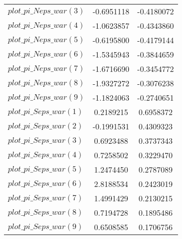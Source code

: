 \begin{center}
\begin{longtable}{lcc}
$plot\_pi\_N eps\_war (3)   $	 & 	     -0.6951118	 & 	     -0.4180072 \\ 
$plot\_pi\_N eps\_war (4)   $	 & 	     -1.0623857	 & 	     -0.4343860 \\ 
$plot\_pi\_N eps\_war (5)   $	 & 	     -0.6195800	 & 	     -0.4179144 \\ 
$plot\_pi\_N eps\_war (6)   $	 & 	     -1.5345943	 & 	     -0.3844659 \\ 
$plot\_pi\_N eps\_war (7)   $	 & 	     -1.6716690	 & 	     -0.3454772 \\ 
$plot\_pi\_N eps\_war (8)   $	 & 	     -1.9327272	 & 	     -0.3076238 \\ 
$plot\_pi\_N eps\_war (9)   $	 & 	     -1.1824063	 & 	     -0.2740651 \\ 
$plot\_pi\_S eps\_war (1)   $	 & 	      0.2189215	 & 	      0.6958372 \\ 
$plot\_pi\_S eps\_war (2)   $	 & 	     -0.1991531	 & 	      0.4309323 \\ 
$plot\_pi\_S eps\_war (3)   $	 & 	      0.6923488	 & 	      0.3737343 \\ 
$plot\_pi\_S eps\_war (4)   $	 & 	      0.7258502	 & 	      0.3229470 \\ 
$plot\_pi\_S eps\_war (5)   $	 & 	      1.2474450	 & 	      0.2787089 \\ 
$plot\_pi\_S eps\_war (6)   $	 & 	      2.8188534	 & 	      0.2423019 \\ 
$plot\_pi\_S eps\_war (7)   $	 & 	      1.4991429	 & 	      0.2130215 \\ 
$plot\_pi\_S eps\_war (8)   $	 & 	      0.7194728	 & 	      0.1895486 \\ 
$plot\_pi\_S eps\_war (9)   $	 & 	      0.6508585	 & 	      0.1706756 \\ 
\end{longtable}
 \end{center}
